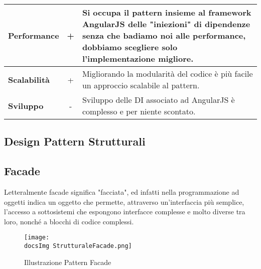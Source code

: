 {{{\begin{itemize}
{\begin{tabular}{|l|c|l|}
						\hline
						\textbf{Performance} & + & Si occupa il pattern insieme al framework AngularJS delle "iniezioni" di dipendenze senza che badiamo noi alle performance, dobbiamo scegliere solo l'implementazione migliore. \\
						\hline
						\textbf{Scalabilità} & + & Migliorando la modularità del codice è più facile un approccio scalabile al pattern. \\
						\hline
						\textbf{Sviluppo} & - & Sviluppo delle DI associato ad AngularJS è complesso e per niente scontato. \\
						\hline
					\end{tabular}
				}
			\end{itemize}
		}	
	}
	\subsection{Design Pattern Strutturali}{
		\subsection{Facade}{
			Letteralmente facade significa "facciata", ed infatti nella programmazione ad oggetti indica un oggetto che permette, attraverso un'interfaccia più semplice, l'accesso a sottosistemi che espongono interfacce complesse e molto diverse tra loro, nonché a blocchi di codice complessi.
			
			\begin{figure}[ht]
				\centering
				\texttt{[image: \\docsImg StrutturaleFacade.png]}
				\caption{Illustrazione Pattern Facade}
				\label{Illustrazione Pattern Facade}
			\end{figure}
			
}}}
